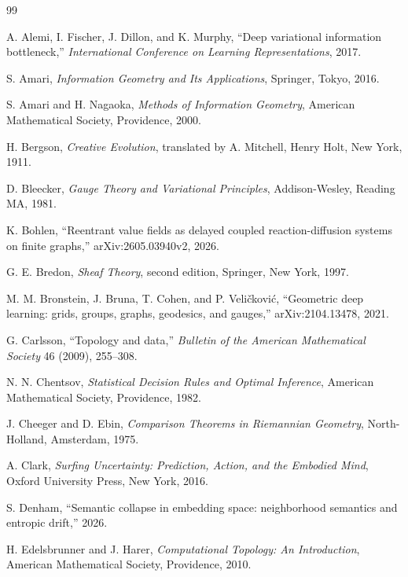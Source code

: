\documentclass[12pt, oneside]{book}
\theoremstyle{plain-flyxion}
\theoremstyle{definition-flyxion}
\begin{document}
\backmatter

\begin{thebibliography}{99}

A. Alemi, I. Fischer, J. Dillon, and K. Murphy,
``Deep variational information bottleneck,''
\textit{International Conference on Learning Representations}, 2017.

S. Amari,
\textit{Information Geometry and Its Applications},
Springer, Tokyo, 2016.

S. Amari and H. Nagaoka,
\textit{Methods of Information Geometry},
American Mathematical Society, Providence, 2000.

H. Bergson,
\textit{Creative Evolution},
translated by A. Mitchell, Henry Holt, New York, 1911.

D. Bleecker,
\textit{Gauge Theory and Variational Principles},
Addison-Wesley, Reading MA, 1981.

K. Bohlen,
``Reentrant value fields as delayed coupled reaction-diffusion systems on finite graphs,''
arXiv:2605.03940v2, 2026.

G. E. Bredon,
\textit{Sheaf Theory}, second edition,
Springer, New York, 1997.

M. M. Bronstein, J. Bruna, T. Cohen, and P. Veli\v{c}kovi\'{c},
``Geometric deep learning: grids, groups, graphs, geodesics, and gauges,''
arXiv:2104.13478, 2021.

G. Carlsson,
``Topology and data,''
\textit{Bulletin of the American Mathematical Society} 46 (2009), 255--308.

N. N. Chentsov,
\textit{Statistical Decision Rules and Optimal Inference},
American Mathematical Society, Providence, 1982.

J. Cheeger and D. Ebin,
\textit{Comparison Theorems in Riemannian Geometry},
North-Holland, Amsterdam, 1975.

A. Clark,
\textit{Surfing Uncertainty: Prediction, Action, and the Embodied Mind},
Oxford University Press, New York, 2016.

S. Denham,
``Semantic collapse in embedding space: neighborhood semantics and entropic drift,''
2026.

H. Edelsbrunner and J. Harer,
\textit{Computational Topology: An Introduction},
American Mathematical Society, Providence, 2010.


\end{thebibliography}
\end{document}
